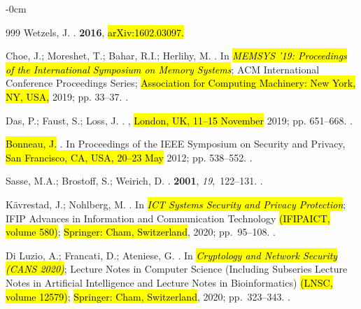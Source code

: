 \documentclass[mathematics,article,accept,pdftex,moreauthors]{Definitions/mdpi}
\begin{document}
\begin{adjustwidth}{-\extralength}{0cm}
\begin{thebibliography}{999}
Wetzels, J.
.
 {\bf 2016}, \hl{arXiv:1602.03097.}%

Choe, J.; Moreshet, T.; Bahar, R.I.; Herlihy, M.
.
\newblock In \emph{\hl{MEMSYS '19: Proceedings of the International Symposium on Memory Systems}}; {ACM International Conference Proceedings Series}; \hl{Association for Computing Machinery: New York, NY, USA,} 2019; pp.
  33--37.
.

Das, P.; Faust, S.; Loss, J.
.
, \hl{London, UK, 11--15 November} 2019;  pp. 651--668.
.

\hl{Bonneau, J.}
.
\newblock In Proceedings of the IEEE Symposium on Security and
  Privacy,  \hl{San Francisco, CA, USA, 20--23 May} 2012; pp. 538--552.
.

Sasse, M.A.; Brostoff, S.; Weirich, D.
.
 {\bf 2001}, {\em 19},~122--131.
.

K{\"{a}}vrestad, J.; Nohlberg, M.
.
\newblock In \emph{\hl{ICT Systems Security and Privacy Protection}}; {IFIP Advances in Information and Communication Technology} \hl{(IFIPAICT, volume 580)}; \hl{Springer: Cham, Switzerland},  2020; pp.~95--108.
.

{Di Luzio}, A.; Francati, D.; Ateniese, G.
.
\newblock In \emph{\hl{Cryptology and Network Security
(CANS 2020)}}; {Lecture Notes in Computer Science (Including Subseries Lecture
  Notes in Artificial Intelligence and Lecture Notes in Bioinformatics)} \hl{(LNSC, volume 12579)};  \hl{Springer: Cham, Switzerland},  2020; pp.~323--343.
.


\end{thebibliography}
\end{adjustwidth}
\end{document}
